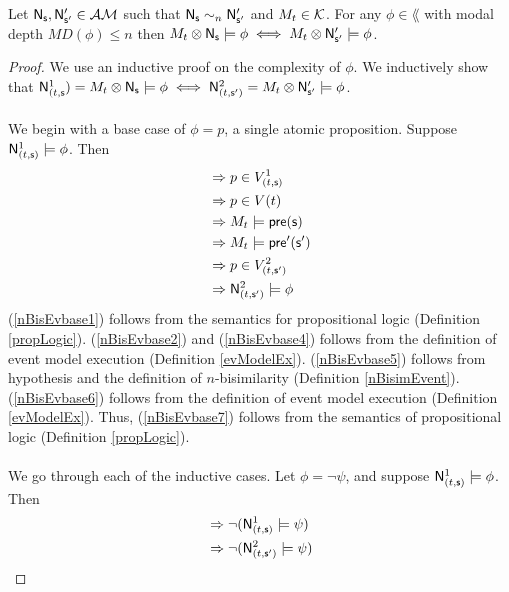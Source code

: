 \begin{lemma} \label{nBisimilarEventExec}
	Let $\mathrm{\mathsf{N}}_\mathrm{\mathsf{s}}, \mathrm{\mathsf{N}}'_{\mathrm{\mathsf{s}}'} \in \mathcal{AM}$ such that $\mathrm{\mathsf{N}}_\mathrm{\mathsf{s}} \sim_n \mathrm{\mathsf{N}}'_{\mathrm{\mathsf{s}}'}$ and
	$M_t \in \mathcal{K}$.
	For any $\phi \in \lang$ with modal depth $MD(\phi) \leq n$ then $M_t \otimes \mathrm{\mathsf{N}}_\mathrm{\mathsf{s}} \models \phi
	\iff M_t \otimes \mathrm{\mathsf{N}}'_{\mathrm{\mathsf{s}}'} \models \phi$.
\end{lemma}

\begin{proof}
We use an inductive proof on the complexity of $\phi$.
We inductively show that $\mathrm{\mathsf{N}}^1_{(t,\mathrm{\mathsf{s}}}) = M_t \otimes \mathrm{\mathsf{N}}_\mathrm{\mathsf{s}} \models \phi \iff \mathrm{\mathsf{N}}^2_{(t,\mathrm{\mathsf{s}}')} = M_t \otimes
\mathrm{\mathsf{N}}'_{\mathrm{\mathsf{s}}'} \models \phi$.\\
\\
We begin with a base case of $\phi = p$, a single atomic proposition.
Suppose $\mathrm{\mathsf{N}}^1_{(t,\mathrm{\mathsf{s}})} \models \phi$.
Then
\begin{align}
	& \Rightarrow p \in V^1_{(t,\mathrm{\mathsf{s}})} \label{nBisEvbase1} \\
	& \Rightarrow p \in V(t) \label{nBisEvbase2} \\
	& \Rightarrow M_t \models \mathrm{\mathsf{pre}}(\mathrm{\mathsf{s}}) \label{nBisEvbase4} \\
	& \Rightarrow M_t \models \mathrm{\mathsf{pre}}'(\mathrm{\mathsf{s}}') \label{nBisEvbase5} \\
	& \Rightarrow p \in V^2_{(t,\mathrm{\mathsf{s}}')} \label{nBisEvbase6}\\
	& \Rightarrow \mathrm{\mathsf{N}}^2_{(t,\mathrm{\mathsf{s}}')} \models \phi \label{nBisEvbase7}
\end{align}
(\ref{nBisEvbase1}) follows from the semantics for propositional logic (Definition \ref{propLogic}).
(\ref{nBisEvbase2}) and (\ref{nBisEvbase4}) follows from the definition of event model execution (Definition
\ref{evModelEx}).
(\ref{nBisEvbase5}) follows from hypothesis and the definition of $n$-bisimilarity (Definition
\ref{nBisimEvent}).
(\ref{nBisEvbase6}) follows from the definition of event model execution (Definition
\ref{evModelEx}).
Thus, (\ref{nBisEvbase7}) follows from the semantics of propositional logic (Definition
\ref{propLogic}).\\
\\
We go through each of the inductive cases.
Let $\phi = \neg \psi$, and suppose $\mathrm{\mathsf{N}}^1_{(t,\mathrm{\mathsf{s}})} \models \phi$.
Then
\begin{align}
	& \Rightarrow \neg (\evMo^1_{(t,\evs)} \models \psi) \label{nBisEvNeg1} \\
	& \Rightarrow \neg (\evMo^2_{(t,\evs')} \models \psi) \label{nBisEvNeg2} \\

\end{align}
\end{proof}

